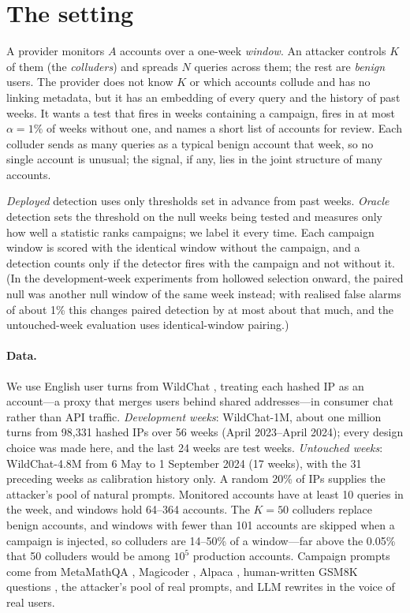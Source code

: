 \section{The setting}
\label{sec:setting}

A provider monitors $A$ accounts over a one-week \emph{window}. An attacker controls $K$ of them (the \emph{colluders}) and spreads $N$ queries across them; the rest are \emph{benign} users. The provider does not know $K$ or which accounts collude and has no linking metadata, but it has an embedding of every query and the history of past weeks. It wants a test that fires in weeks containing a campaign, fires in at most $\alpha=1\%$ of weeks without one, and names a short list of accounts for review. Each colluder sends as many queries as a typical benign account that week, so no single account is unusual; the signal, if any, lies in the joint structure of many accounts.

\emph{Deployed} detection uses only thresholds set in advance from past weeks. \emph{Oracle} detection sets the threshold on the null weeks being tested and measures only how well a statistic ranks campaigns; we label it every time. Each campaign window is scored with the identical window without the campaign, and a detection counts only if the detector fires with the campaign and not without it. (In the development-week experiments from hollowed selection onward, the paired null was another null window of the same week instead; with realised false alarms of about 1\% this changes paired detection by at most about that much, and the untouched-week evaluation uses identical-window pairing.)

\paragraph{Data.} We use English user turns from WildChat \citep{zhao2024wildchat}, treating each hashed IP as an account---a proxy that merges users behind shared addresses---in consumer chat rather than API traffic. \emph{Development weeks}: WildChat-1M, about one million turns from 98{,}331 hashed IPs over 56 weeks (April 2023--April 2024); every design choice was made here, and the last 24 weeks are test weeks. \emph{Untouched weeks}: WildChat-4.8M from 6 May to 1 September 2024 (17 weeks), with the 31 preceding weeks as calibration history only. A random 20\% of IPs supplies the attacker's pool of natural prompts. Monitored accounts have at least 10 queries in the week, and windows hold 64--364 accounts. The $K=50$ colluders replace benign accounts, and windows with fewer than 101 accounts are skipped when a campaign is injected, so colluders are 14--50\% of a window---far above the 0.05\% that 50 colluders would be among $10^5$ production accounts. Campaign prompts come from MetaMathQA \citep{yu2024metamath}, Magicoder \citep{wei2024magicoder}, Alpaca \citep{taori2023alpaca}, human-written GSM8K questions \citep{cobbe2021gsm8k}, the attacker's pool of real prompts, and LLM rewrites in the voice of real users.
